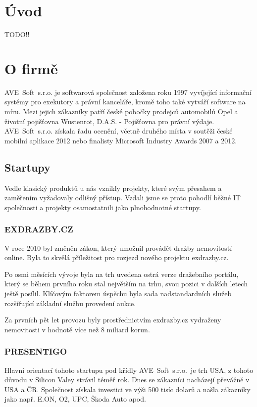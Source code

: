 \documentclass[czech,bachelor,dept460,male,csharp]{diploma}
\newcommand{\AveSoft}{AVE~Soft~s.r.o.}
\begin{document}
\MakeTitlePages

\section{Úvod}
TODO!!

\section{O firmě}
	\AveSoft\cite{avesoftL} je softwarová společnost založena roku 1997 vyvíjející informační systémy pro exekutory a právní kanceláře, kromě toho také vytváří software na míru.
	Mezi jejich zákazníky patří české pobočky prodejců automobilů Opel a životní pojišťovna Wustenrot, D.A.S. - Pojišťovna pro právní výdaje.
	\AveSoft\cite{avesoft} získala řadu ocenění, včetně druhého místa v soutěži české mobilní aplikace 2012 nebo finalisty Microsoft Industry Awards 2007 a 2012.
	\subsection{Startupy}
	Vedle klasický produktů u nás vznikly projekty, které svým přesahem a zaměřením vyžadovaly odlišný přístup. Vzdali jsme se proto pohodlí běžné IT společnosti a projekty osamostatnili jako plnohodnotné startupy.
 		\subsubsection{EXDRAZBY.CZ}
 		V roce 2010 byl změněn zákon, který umožnil provádět dražby nemovitostí online. Byla to skvělá příležitost pro rozjezd nového projektu exdrazby.cz.

		Po osmi měsících vývoje byla na trh uvedena ostrá verze dražebního portálu, který se během prvního roku stal největším na trhu, svou pozici v dalších letech ještě posílil. Klíčovým faktorem úspěchu byla sada nadstandardních služeb rozšiřující základní službu provedení aukce.

		Za prvních pět let provozu byly prostřednictvím exdrazby.cz vydraženy nemovitosti v hodnotě více než 8 miliard korun.
 		\subsubsection{PRESENTIGO}
 		Hlavní orientací tohoto startupu pod křídly \AveSoft\ je trh USA, z tohoto důvodu v Silicon Valey strávil téměř rok. Dnes se zákazníci nacházejí převážně v USA a ČR. Společnost získala investici ve výši 500 tisíc dolarů a našla zákazníky jako např. E.ON, O2, UPC, Škoda Auto apod.
\end{document}
